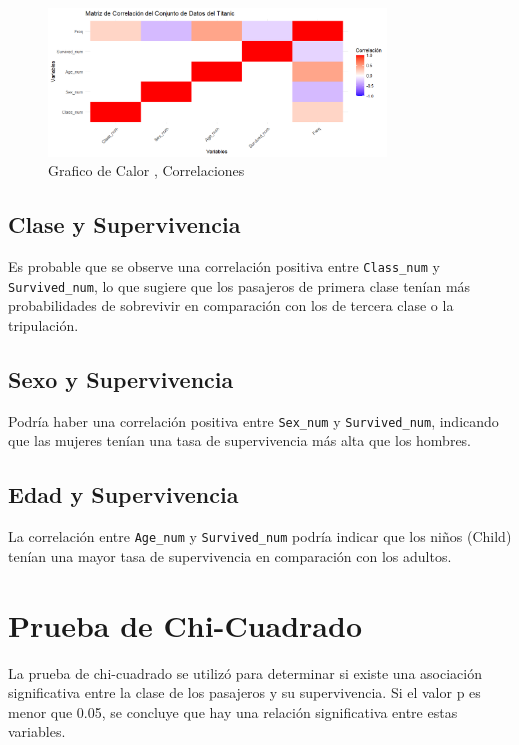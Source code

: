 \documentclass{article}
\begin{document}
\begin{figure}[h] %
    \centering %
    \includegraphics[width=0.8\textwidth]{Correlacion.png}
    \caption{Grafico de Calor , Correlaciones } %
    \label{fig:mi_imagen} %
\end{figure}

\subsection{Clase y Supervivencia}
Es probable que se observe una correlación positiva entre \texttt{Class\_num} y \texttt{Survived\_num}, lo que sugiere que los pasajeros de primera clase tenían más probabilidades de sobrevivir en comparación con los de tercera clase o la tripulación.

\subsection{Sexo y Supervivencia}
Podría haber una correlación positiva entre \texttt{Sex\_num} y \texttt{Survived\_num}, indicando que las mujeres tenían una tasa de supervivencia más alta que los hombres.

\subsection{Edad y Supervivencia}
La correlación entre \texttt{Age\_num} y \texttt{Survived\_num} podría indicar que los niños (Child) tenían una mayor tasa de supervivencia en comparación con los adultos.

\section{Prueba de Chi-Cuadrado}
La prueba de chi-cuadrado se utilizó para determinar si existe una asociación significativa entre la clase de los pasajeros y su supervivencia. Si el valor p es menor que 0.05, se concluye que hay una relación significativa entre estas variables.
\end{document}
